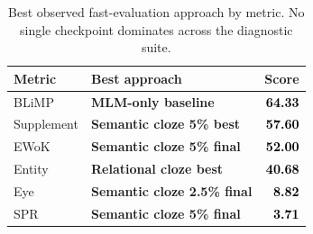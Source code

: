 \begin{table}[t]
\centering
\small
\begin{tabular}{llr}
\toprule
\textbf{Metric} & \textbf{Best approach} & \textbf{Score} \\
\midrule
\rowcolor{tablegray} BLiMP & \textbf{MLM-only baseline} & \textcolor{black}{\textbf{64.33}} \\
Supplement & \textbf{Semantic cloze 5\% best} & \textcolor{black}{\textbf{57.60}} \\
\rowcolor{tablegray} EWoK & \textbf{Semantic cloze 5\% final} & \textcolor{black}{\textbf{52.00}} \\
Entity & \textbf{Relational cloze best} & \textcolor{black}{\textbf{40.68}} \\
\rowcolor{tablegray} Eye & \textbf{Semantic cloze 2.5\% final} & \textcolor{black}{\textbf{8.82}} \\
SPR & \textbf{Semantic cloze 5\% final} & \textcolor{black}{\textbf{3.71}} \\
\bottomrule
\end{tabular}
\caption{Best observed fast-evaluation approach by metric. No single checkpoint dominates across the diagnostic suite.}
\label{tab:best-by-metric}
\end{table}
